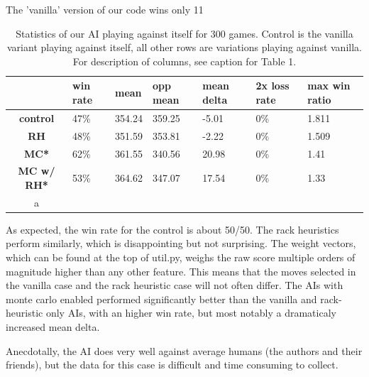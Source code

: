 \documentclass[12pt]{article}
\begin{document}
The 'vanilla' version of our code wins only 11%

\begin{table}[h!]
  \centering
  \begin{tabular}{c|l|l|l|l|l|l}
    \textbf{} & \textbf{win rate} & \textbf{mean} & \textbf{opp mean} & \textbf{mean delta} &  \textbf{2x loss rate} & \textbf{max win ratio} \\\hline
  \textbf{control}   & 47\% & 354.24 & 359.25 & -5.01  & 0\%  & 1.811\\
  \textbf{RH}        & 48\% & 351.59 & 353.81 & -2.22  & 0\%  & 1.509\\
  \textbf{MC*}       & 62\% & 361.55 & 340.56 & 20.98  & 0\%  & 1.41 \\
  \textbf{MC w/ RH*} & 53\% & 364.62 & 347.07 & 17.54  & 0\%  & 1.33 \\a 
\end{tabular}
  \caption{Statistics of our AI playing against itself for 300
    games. Control is the vanilla variant playing against itself, all
    other rows are variations playing against vanilla. For description
    of columns, see caption for Table 1.}
\end{table}

As expected, the win rate for the control is about 50/50. The rack
heuristics perform similarly, which is disappointing but not
surprising. The weight vectors, which can be found at the top of
util.py, weighs the raw score multiple orders of magnitude higher than
any other feature. This means that the moves selected in the vanilla
case and the rack heuristic case will not often differ. The AIs with monte carlo enabled performed significantly better than the vanilla and rack-heuristic only AIs, with an higher win rate, but most notably a dramaticaly increased mean delta. 

Anecdotally, the AI does very well against average humans (the authors and their friends), but the data for this case is difficult and time consuming to collect.
\end{document}

